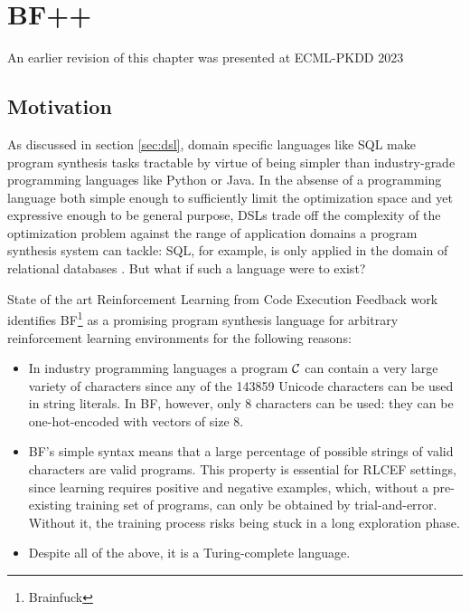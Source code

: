 \chapter{BF++}\label{ch:bfpp}

\begin{remark}
    An earlier revision of this chapter \cite{liventsevBFLanguageGeneralpurpose2022} was presented at ECML-PKDD 2023
\end{remark}

\section{Motivation}

As discussed in section \ref{sec:dsl}, domain specific languages like SQL make program synthesis tasks tractable by virtue of being simpler than industry-grade programming languages like Python or Java.
In the absense of a programming language both simple enough to sufficiently limit the optimization space and yet expressive enough to be general purpose, DSLs trade off the complexity of the optimization problem against the range of application domains a program synthesis system can tackle: SQL, for example, is only applied in the domain of relational databases \cite{atzeniRelationalDatabaseTheory1993}.
But what if such a language were to exist?

State of the art Reinforcement Learning from Code Execution Feedback work \cite{abolafiaNeuralProgramSynthesis2018} identifies BF\footnote{Brainfuck} \cite{brainfuck} as a promising program synthesis language for arbitrary reinforcement learning environments for the following reasons:
\begin{itemize}
    \item In industry programming languages a program $\mathcal{C}$ can contain a very large variety of characters since any of the 143859 Unicode \cite{allenUnicodeStandard2012} characters can be used in string literals. In BF, however, only 8 characters can be used: they can be one-hot-encoded with vectors of size 8. 
    \item BF's simple syntax means that a large percentage of possible strings of valid characters are valid programs. 
    This property is essential for RLCEF settings, since learning requires positive and negative examples, which, without a pre-existing training set of programs, can only be obtained by trial-and-error.
    Without it, the training process risks being stuck in a long exploration phase.
    \item Despite all of the above, it is a Turing-complete language.
\end{itemize}

